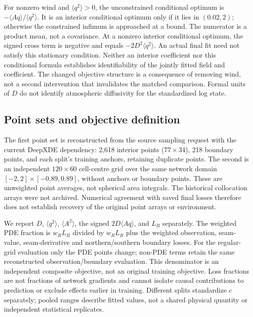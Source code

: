 \documentclass[11pt,a4paper]{article}
\begin{document}
For nonzero wind and $\langle q^2\rangle>0$, the unconstrained conditional optimum is $-\langle Aq\rangle/\langle q^2\rangle$. It is an interior conditional optimum only if it lies in $(0.02,2)$; otherwise the constrained infimum is approached at a bound. The numerator is a product mean, not a covariance. At a nonzero interior conditional optimum, the signed cross term is negative and equals $-2D^2\langle q^2\rangle$. An actual final fit need not satisfy this stationary condition. Neither an interior coefficient nor this conditional formula establishes identifiability of the jointly fitted field and coefficient. The changed objective structure is a consequence of removing wind, not a second intervention that invalidates the matched comparison. Formal units of $D$ do not identify atmospheric diffusivity for the standardized log state.

\subsection*{Point sets and objective definition}
The first point set is reconstructed from the source sampling request with the current DeepXDE dependency: 2,618 interior points ($77\times34$), 218 boundary points, and each split's training anchors, retaining duplicate points. The second is an independent $120\times60$ cell-centre grid over the same network domain $[-2,2]\times[-0.89,0.89]$, without anchors or boundary points. These are unweighted point averages, not spherical area integrals. The historical collocation arrays were not archived. Numerical agreement with saved final losses therefore does not establish recovery of the original point arrays or environment.

We report $D$, $\langle q^2\rangle$, $\langle A^2\rangle$, the signed $2D\langle Aq\rangle$, and $L_R$ separately. The weighted PDE fraction is $w_R L_R$ divided by $w_R L_R$ plus the weighted observation, seam-value, seam-derivative and northern/southern boundary losses. For the regular-grid evaluation only the PDE points change; non-PDE terms retain the same reconstructed observation/boundary evaluation. This denominator is an independent composite objective, not an original training objective. Loss fractions are not fractions of network gradients and cannot isolate causal contributions to prediction or exclude effects earlier in training. Different splits standardize $c$ separately; pooled ranges describe fitted values, not a shared physical quantity or independent statistical replicates.
\end{document}
